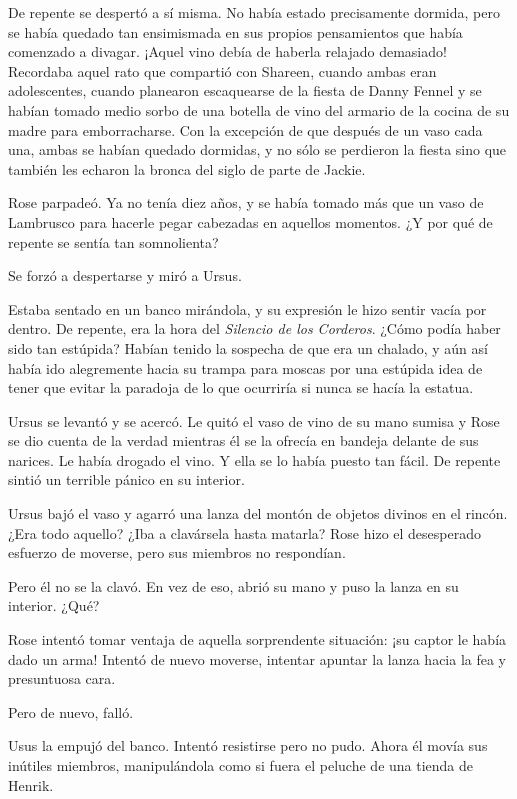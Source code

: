 De repente se despertó a sí misma. No había estado precisamente dormida,
pero se había quedado tan ensimismada en sus propios pensamientos que
había comenzado a divagar. ¡Aquel vino debía de haberla relajado
demasiado! Recordaba aquel rato que compartió con Shareen, cuando ambas
eran adolescentes, cuando planearon escaquearse de la fiesta de Danny
Fennel y se habían tomado medio sorbo de una botella de vino del armario
de la cocina de su madre para emborracharse. Con la excepción de que
después de un vaso cada una, ambas se habían quedado dormidas, y no sólo
se perdieron la fiesta sino que también les echaron la bronca del siglo
de parte de Jackie.

Rose parpadeó. Ya no tenía diez años, y se había tomado más que un vaso
de Lambrusco para hacerle pegar cabezadas en aquellos momentos. ¿Y por
qué de repente se sentía tan somnolienta?

Se forzó a despertarse y miró a Ursus.

Estaba sentado en un banco mirándola, y su expresión le hizo sentir
vacía por dentro. De repente, era la hora del \emph{Silencio de los
Corderos}. ¿Cómo podía haber sido tan estúpida? Habían tenido la
sospecha de que era un chalado, y aún así había ido alegremente hacia su
trampa para moscas por una estúpida idea de tener que evitar la paradoja
de lo que ocurriría si nunca se hacía la estatua.

Ursus se levantó y se acercó. Le quitó el vaso de vino de su mano sumisa
y Rose se dio cuenta de la verdad mientras él se la ofrecía en bandeja
delante de sus narices. Le había drogado el vino. Y ella se lo había
puesto tan fácil. De repente sintió un terrible pánico en su interior.

Ursus bajó el vaso y agarró una lanza del montón de objetos divinos en
el rincón. ¿Era todo aquello? ¿Iba a clavársela hasta matarla? Rose hizo
el desesperado esfuerzo de moverse, pero sus miembros no respondían.

Pero él no se la clavó. En vez de eso, abrió su mano y puso la lanza en
su interior. ¿Qué?

Rose intentó tomar ventaja de aquella sorprendente situación: ¡su captor
le había dado un arma! Intentó de nuevo moverse, intentar apuntar la
lanza hacia la fea y presuntuosa cara.

Pero de nuevo, falló.

Usus la empujó del banco. Intentó resistirse pero no pudo. Ahora él
movía sus inútiles miembros, manipulándola como si fuera el peluche de
una tienda de Henrik.

